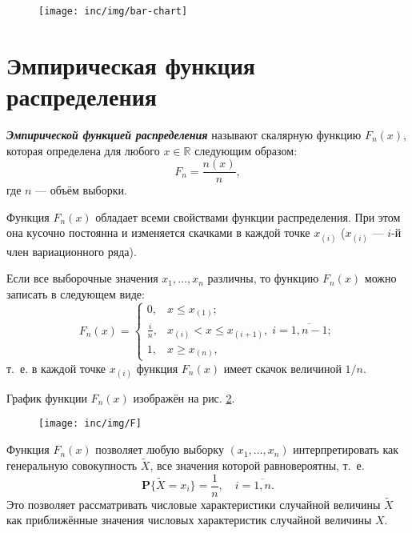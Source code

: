 \documentclass[a4paper,oneside,12pt]{extreport}
\begin{document}
\begin{figure}[H]
	\centering
	\texttt{[image: inc/img/bar-chart]}
	\caption{}
	\label{img:bar-chart}
\end{figure}

\pagebreak
\section{Эмпирическая функция распределения}

\begin{definition}
	{\itshape\bfseries Эмпирической функцией распределения} называют скалярную функцию $F_n(x)$, которая определена для любого $x\in\mathbb R$ следующим образом:
	\begin{equation}
		F_n = \frac{n(x)}n,
	\end{equation}
	где $n$ — объём выборки.
\end{definition}

Функция $F_n(x)$ обладает всеми свойствами функции распределения.
При этом она кусочно постоянна и изменяется скачками в каждой точке $x_{(i)}$ ($x_{(i)}$ — $i$-й член вариационного ряда).

Если все выборочные значения $x_1, \ldots, x_n$ различны, то функцию $F_n(x)$ можно записать в следующем виде:
\begin{equation}
	F_n(x) = \begin{cases}
		0,        & x \leqslant x_{(1)};\\
		\frac in, & x_{(i)} < x \leqslant x_{(i+1)}, \; i=\overline{1,n-1};\\
		1,        & x \geqslant x_{(n)},
	\end{cases}
\end{equation}
т.~е. в каждой точке $x_{(i)}$ функция $F_n(x)$ имеет скачок величиной $1/n$.

График функции $F_n(x)$ изображён на рис. \ref{img:F}.

\begin{figure}[H]
	\centering
	\texttt{[image: inc/img/F]}
	\caption{}
	\label{img:F}
\end{figure}

\begin{remark}
	Функция $F_n(x)$ позволяет любую выборку $(x_1, \ldots, x_n)$ интерпретировать как генеральную совокупность $\widetilde X$, все значения которой равновероятны, т.~е.
	\begin{equation}
		\mathbf P\{\widetilde X=x_i\}=\frac1n,\quad i=\overline{1,n}.
	\end{equation}
	Это позволяет рассматривать числовые характеристики случайной величины $\widetilde{X}$ как приближённые значения числовых характеристик случайной величины $X$.
\end{remark}
\end{document}
